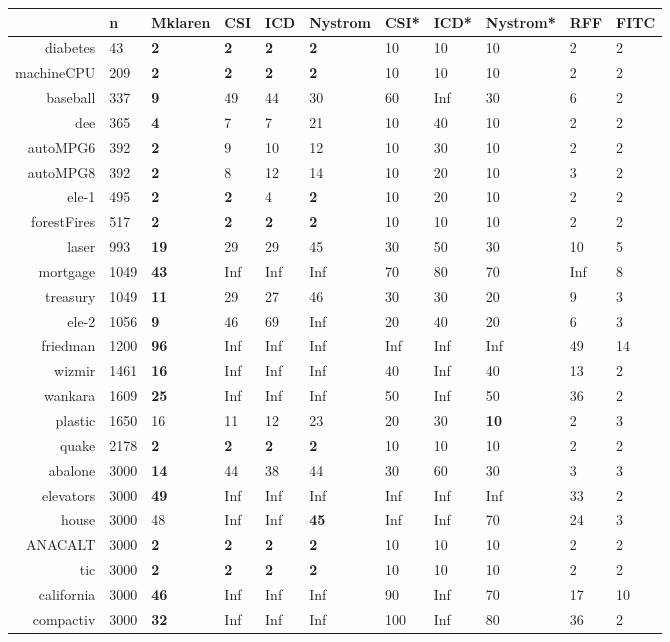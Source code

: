 \begin{table}[ht]
\centering
\begin{tabular}{rl||llll|lll|l|l}
  \hline
 & n & Mklaren & CSI & ICD & Nystrom & CSI* & ICD* & Nystrom* & RFF & FITC \\ 
  \hline
diabetes & 43 & \textbf{2} & \textbf{2} & \textbf{2} & \textbf{2} & 10 & 10 & 10 & 2 & 2 \\ 
  machineCPU & 209 & \textbf{2} & \textbf{2} & \textbf{2} & \textbf{2} & 10 & 10 & 10 & 2 & 2 \\ 
  baseball & 337 & \textbf{9} & 49 & 44 & 30 & 60 & Inf & 30 & 6 & 2 \\ 
  dee & 365 & \textbf{4} & 7 & 7 & 21 & 10 & 40 & 10 & 2 & 2 \\ 
  autoMPG6 & 392 & \textbf{2} & 9 & 10 & 12 & 10 & 30 & 10 & 2 & 2 \\ 
  autoMPG8 & 392 & \textbf{2} & 8 & 12 & 14 & 10 & 20 & 10 & 3 & 2 \\ 
  ele-1 & 495 & \textbf{2} & \textbf{2} & 4 & \textbf{2} & 10 & 20 & 10 & 2 & 2 \\ 
  forestFires & 517 & \textbf{2} & \textbf{2} & \textbf{2} & \textbf{2} & 10 & 10 & 10 & 2 & 2 \\ 
  laser & 993 & \textbf{19} & 29 & 29 & 45 & 30 & 50 & 30 & 10 & 5 \\ 
  mortgage & 1049 & \textbf{43} & Inf & Inf & Inf & 70 & 80 & 70 & Inf & 8 \\ 
  treasury & 1049 & \textbf{11} & 29 & 27 & 46 & 30 & 30 & 20 & 9 & 3 \\ 
  ele-2 & 1056 & \textbf{9} & 46 & 69 & Inf & 20 & 40 & 20 & 6 & 3 \\ 
  friedman & 1200 & \textbf{96} & Inf & Inf & Inf & Inf & Inf & Inf & 49 & 14 \\ 
  wizmir & 1461 & \textbf{16} & Inf & Inf & Inf & 40 & Inf & 40 & 13 & 2 \\ 
  wankara & 1609 & \textbf{25} & Inf & Inf & Inf & 50 & Inf & 50 & 36 & 2 \\ 
  plastic & 1650 & 16 & 11 & 12 & 23 & 20 & 30 & \textbf{10} & 2 & 3 \\ 
  quake & 2178 & \textbf{2} & \textbf{2} & \textbf{2} & \textbf{2} & 10 & 10 & 10 & 2 & 2 \\ 
  abalone & 3000 & \textbf{14} & 44 & 38 & 44 & 30 & 60 & 30 & 3 & 3 \\ 
  elevators & 3000 & \textbf{49} & Inf & Inf & Inf & Inf & Inf & Inf & 33 & 2 \\ 
  house & 3000 & 48 & Inf & Inf & \textbf{45} & Inf & Inf & 70 & 24 & 3 \\ 
  ANACALT & 3000 & \textbf{2} & \textbf{2} & \textbf{2} & \textbf{2} & 10 & 10 & 10 & 2 & 2 \\ 
  tic & 3000 & \textbf{2} & \textbf{2} & \textbf{2} & \textbf{2} & 10 & 10 & 10 & 2 & 2 \\ 
  california & 3000 & \textbf{46} & Inf & Inf & Inf & 90 & Inf & 70 & 17 & 10 \\ 
  compactiv & 3000 & \textbf{32} & Inf & Inf & Inf & 100 & Inf & 80 & 36 & 2 \\ 
   \hline
\end{tabular}
\end{table}
